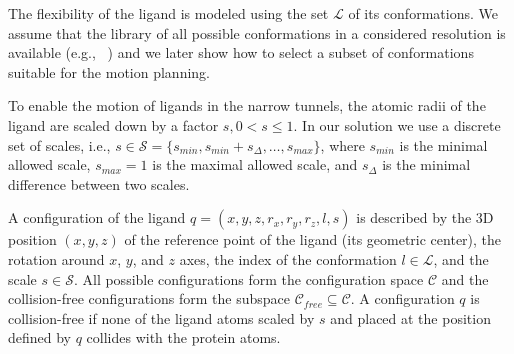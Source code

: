 \documentclass[usletter, 10pt, conference]{ieeeconf} %
\def\C{\mathcal{C}}
\def\CF{\mathcal{C}_{free}}
\def\CFD{{\mathcal{C}^s_{free}}}
\def\smin{s_{min}}
\def\smax{s_{max}}
\def\sdelta{s_{\Delta}}
\def\L{\mathcal{L}}
\def\S{\mathcal{S}}
\begin{document}


The flexibility of the ligand is modeled using the set $\L$ of its conformations.
We assume that the library of all possible conformations in a considered resolution is available (e.g., ~\cite{dunbrack}) and we later show how to select a subset of conformations suitable for the motion planning.

To enable the motion of ligands in the narrow tunnels, the atomic radii of the ligand are scaled down by a factor $s, 0 < s \le 1$.
In our solution we use a discrete set of scales, i.e., $s \in \S=\{\smin, \smin+\sdelta, \ldots, \smax\}$, where 
$\smin$ is the minimal allowed scale, $\smax=1$ is the maximal allowed scale, and $\sdelta$ is the minimal difference between two scales.

A configuration of the ligand $q=(x,y,z,r_x,r_y,r_z,l,s)$ is described
by the 3D position $(x,y,z)$ of the reference point of the ligand (its geometric center), the rotation around $x$, $y$, and $z$ axes,
the index of the conformation $l\in \L$, and the scale $s \in \S$.
All possible configurations form the configuration space $\C$ and the collision-free configurations
form the subspace $\CF \subseteq \C$.
A configuration $q$ is collision-free if none of the ligand atoms scaled by $s$ and placed at the
position defined by $q$ collides with the protein atoms.
\end{document}
